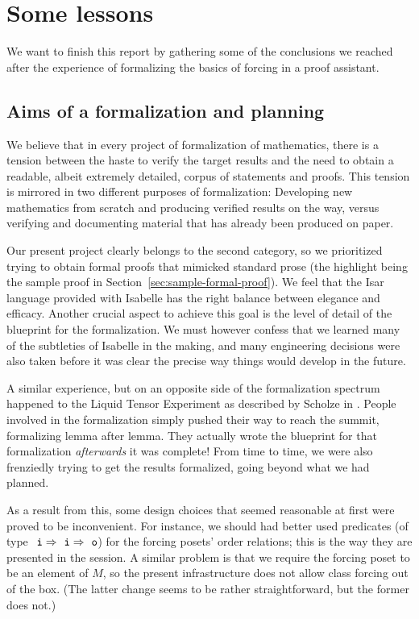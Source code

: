 \section{Some lessons}\label{sec:lessons}

We want to finish this report by gathering some of the conclusions we
reached after the experience of formalizing the basics of forcing in a
proof assistant.

\subsection{Aims of a formalization and planning}

We believe that in every project of formalization of mathematics,
there is a tension between the haste to verify the target results and
the need to obtain a readable, albeit extremely detailed, corpus of
statements and proofs. This tension is mirrored in two different
purposes of formalization: Developing new mathematics from scratch and
producing verified results on the way, versus verifying and
documenting material that has already been produced on paper.

Our present project clearly belongs to the second category, so we
prioritized trying to obtain formal proofs that mimicked standard
prose (the highlight being the sample proof in
Section~\ref{sec:sample-formal-proof}). We feel that the Isar language
provided with Isabelle has the right balance between elegance and
efficacy. Another crucial aspect to achieve this goal is the level of
detail of the blueprint for the formalization. We must however confess
that we learned many of the subtleties of Isabelle in the making, and
many engineering decisions were also taken before it was clear the
precise way things would develop in the future.

A similar experience, but on an opposite side of the formalization
spectrum happened to the Liquid Tensor Experiment as described by Scholze
in \cite{LTE2021}. People involved in the formalization simply pushed
their way to reach the summit, formalizing lemma after lemma. They
actually wrote the blueprint for that formalization \emph{afterwards}
it was complete! From time to time, we were also frenziedly trying to
get the results formalized, going beyond what we had planned.

As a result from this, some design choices that seemed reasonable at
first were proved to be inconvenient. For instance, we should had
better used predicates (of type $\tyi\fun\tyi\fun\tyo$) for the
forcing posets' order relations; this is the way they
are presented in the  session. A similar
problem is that we require the forcing poset to be an element of $M$,
so the present infrastructure does not allow class forcing out of the
box. (The latter change seems to be rather straightforward, but the
former does not.)

